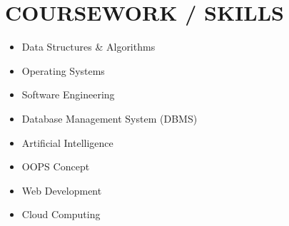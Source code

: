 \documentclass[letterpaper,11pt]{article}
\newcommand{\resumeSubHeadingListStart}{\begin{itemize}[leftmargin=0.0in, label={}]}
\newcommand{\resumeSubHeadingListEnd}{\end{itemize}}
\begin{document}
\section{COURSEWORK / SKILLS}
        \begin{multicols}{4}
            \begin{itemize}[itemsep=-2pt, parsep=5pt]
                \item Data Structures \& Algorithms
                \item Operating Systems
                \item Software Engineering
                \item Database Management System (DBMS)
               \item Artificial Intelligence
                \item OOPS Concept
                \item Web Development
                \item Cloud Computing
            \end{itemize}
        \end{multicols}
        \vspace*{2.0\multicolsep}






\end{document}
